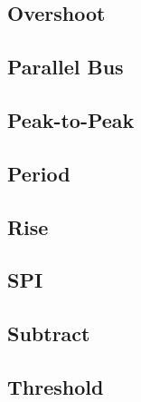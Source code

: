 \subsection{Overshoot}

\pagebreak
\subsection{Parallel Bus}

\pagebreak
\subsection{Peak-to-Peak}

\pagebreak
\subsection{Period}

\pagebreak
\subsection{Rise}

\pagebreak
\subsection{SPI}

\pagebreak
\subsection{Subtract}

\pagebreak
\subsection{Threshold}

